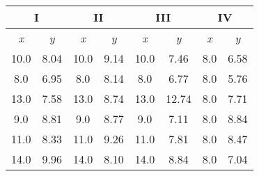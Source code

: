\documentclass[11pt]{article}
\begin{document}
\begin{tabular}{|c|c||c|c||c|c||c|c|}
\hline
\multicolumn{2}{|c||}{\textbf{I}}                                & \multicolumn{2}{c||}{\textbf{II}}                                 & \multicolumn{2}{c||}{\textbf{III}}                                & \multicolumn{2}{c|}{\textbf{IV}}                                 \\  \hline
\multicolumn{1}{|c}{\textit{x}} & \multicolumn{1}{c||}{\textit{y}} & \multicolumn{1}{c}{\textit{x}} & \multicolumn{1}{c||}{\textit{y}} & \multicolumn{1}{c}{\textit{x}} & \multicolumn{1}{c||}{\textit{y}} & \multicolumn{1}{c}{\textit{x}} & \multicolumn{1}{c|}{\textit{y}} \\   \hline
10.0                           & 8.04                           & 10.0                           & 9.14                           & 10.0                           & 7.46                           & 8.0                            & 6.58                           \\    \hline
8.0                            & 6.95                           & 8.0                            & 8.14                           & 8.0                            & 6.77                           & 8.0                            & 5.76                           \\    \hline
13.0                           & 7.58                           & 13.0                           & 8.74                           & 13.0                           & 12.74                          & 8.0                            & 7.71                           \\    \hline
9.0                            & 8.81                           & 9.0                            & 8.77                           & 9.0                            & 7.11                           & 8.0                            & 8.84                           \\    \hline
11.0                           & 8.33                           & 11.0                           & 9.26                           & 11.0                           & 7.81                           & 8.0                            & 8.47                           \\    \hline
14.0                           & 9.96                           & 14.0                           & 8.10                           & 14.0                           & 8.84                           & 8.0                            & 7.04                           \\    \hline

\end{tabular}
\end{document}

